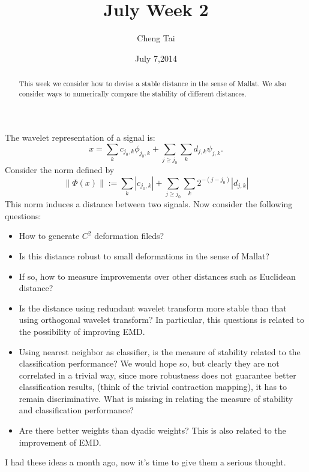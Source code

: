 \documentclass[a4paper]{article}
\title{July Week 2}
\author{Cheng Tai}
\date{July 7,2014}
\begin{document}
\maketitle

\begin{abstract}
This week we consider how to devise a stable distance in the sense of Mallat. We also consider ways to numerically compare the stability of different distances.
\end{abstract}
The wavelet representation of a signal is:
\begin{equation}
	x=\sum_{k} c_{j_0,k} \phi_{j_0,k} + \sum_{j\geq j_0}\sum_{k}d_{j,k}\psi_{j,k}.
\end{equation}
Consider the norm defined by 
\begin{equation}
\|\Phi(x)\|:=\sum_k |c_{j_0,k} | + \sum_{j\geq j_0}\sum_{k}2^{-(j-j_0)}|d_{j,k}|
\end{equation}
This norm induces a distance between two signals. Now consider the following questions:
\begin{itemize}
\item How to generate $C^2$ deformation fileds?
\item Is this distance robust to small deformations in the sense of Mallat?
\item If so, how to measure improvements over other distances such as Euclidean distance?
\item Is the distance using redundant wavelet transform more stable than that using orthogonal wavelet transform? In particular, this questions is related to the possibility of improving EMD.
\item Using nearest neighbor as classifier, is the measure of stability related to the classification performance? We would hope so, but clearly they are not correlated in a trivial way, since more robustness does not guarantee better classification results, (think of the trivial contraction mapping), it has to remain discriminative. What is missing in relating the measure of stability and classification performance?
\item Are there better weights than dyadic weights? This is also related to the improvement of EMD.
\end{itemize}
I had these ideas a month ago, now it's time to give them a serious thought.
\end{document}

